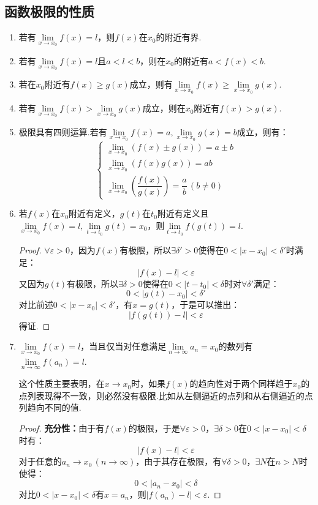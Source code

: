 \subsection{函数极限的性质}
\label{subsec:LimitProperty}
\begin{enumerate}[property]
    \item 若有$\lim\limits_{x\to x_0}f(x)=l$，则$f(x)$在$x_0$的附近有界.
    \item 若有$\lim\limits_{x\to x_0}f(x)=l$且$a<l<b$，则在$x_0$的附近有$a<f(x)<b$.
    \item 若在$x_0$附近有$f(x)\geqslant g(x)$成立，则有$\lim\limits_{x\to x_0}f(x)\geqslant\lim\limits_{x\to x_0}g(x)$.
    \item 若有$\lim\limits_{x\to x_0}f(x)>\lim\limits_{x\to x_0}g(x)$成立，则在$x_0$附近有$f(x)>g(x)$.
    \item 极限具有四则运算.若有$\lim\limits_{x\to x_0}f(x)=a,\lim\limits_{x\to x_0}g(x)=b$成立，则有：
    \[\begin{cases}
        \lim\limits_{x\to x_0}(f(x)\pm g(x)) = a \pm b\\
        \lim\limits_{x\to x_0}(f(x)g(x)) = ab\\
        \lim\limits_{x\to x_0}\left(\dfrac{f(x)}{g(x)}\right) = \dfrac{a}{b}\,(b\neq 0)
    \end{cases}\]
    \item 若$f(x)$在$x_0$附近有定义，$g(t)$在$t_0$附近有定义且$\lim\limits_{x\to x_0}f(x)=l, \lim\limits_{t\to t_0}g(t)=x_0$，则$\lim\limits_{t\to t_0}f(g(t))=l$.
    \begin{proof}
        $\forall \varepsilon > 0$，因为$f(x)$有极限，所以$\exists \delta'>0$使得在$0<|x-x_0|<\delta'$时满足：
        \[|f(x)-l|<\varepsilon\]
        又因为$g(t)$有极限，所以$\exists \delta>0$使得在$0<|t-t_0|<\delta$时对$\forall \delta'$满足：
        \[0<|g(t)-x_0|<\delta'\]
        对比前述$0<|x-x_0|<\delta'$，有$x=g(t)$，于是可以推出：
        \[|f(g(t))-l|<\varepsilon\]
        得证.
    \end{proof}
    \item $\lim\limits_{x\to x_0}f(x)=l$，当且仅当对任意满足$\lim\limits_{n\to\infty}a_n=x_0$的数列有$\lim\limits_{n\to\infty}f(a_n)=l$.
    
    这个性质主要表明，在$x\to x_0$时，如果$f(x)$的趋向性对于两个同样趋于$x_0$的点列表现得不一致，则必然没有极限.比如从左侧逼近的点列和从右侧逼近的点列趋向不同的值.
    \begin{proof}
        \textbf{充分性：}由于有$f(x)$的极限，于是$\forall \varepsilon>0$，$\exists \delta>0$在$0<|x-x_0|<\delta$时有：
        \[|f(x) - l| < \varepsilon\]
        对于任意的$a_n \to x_0 \,(n\to\infty)$，由于其存在极限，有$\forall \delta>0$，$\exists N$在$n>N$时使得：
        \[0<|a_n - x_0|<\delta\]
        对比$0<|x-x_0|<\delta$有$x=a_n$，则$|f(a_n)-l|<\varepsilon$.


\end{proof}
\end{enumerate}
